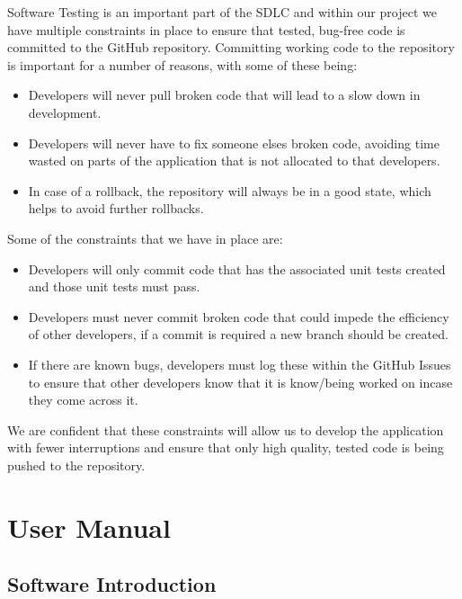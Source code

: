 \documentclass[
  english,
  a4paper,
,tablecaptionabove
]{scrartcl}
\providecommand{\tightlist}{%
  \setlength{\itemsep}{0pt}\setlength{\parskip}{0pt}}
\begin{document}
Software Testing is an important part of the SDLC and within our project
we have multiple constraints in place to ensure that tested, bug-free
code is committed to the GitHub repository. Committing working code to
the repository is important for a number of reasons, with some of these
being:

\begin{itemize}
\tightlist
\item
  Developers will never pull broken code that will lead to a slow down
  in development.
\item
  Developers will never have to fix someone elses broken code, avoiding
  time wasted on parts of the application that is not allocated to that
  developers.
\item
  In case of a rollback, the repository will always be in a good state,
  which helps to avoid further rollbacks.
\end{itemize}

Some of the constraints that we have in place are:

\begin{itemize}
\tightlist
\item
  Developers will only commit code that has the associated unit tests
  created and those unit tests must pass.
\item
  Developers must never commit broken code that could impede the
  efficiency of other developers, if a commit is required a new branch
  should be created.
\item
  If there are known bugs, developers must log these within the GitHub
  Issues to ensure that other developers know that it is know/being
  worked on incase they come across it.
\end{itemize}

We are confident that these constraints will allow us to develop the
application with fewer interruptions and ensure that only high quality,
tested code is being pushed to the repository.

\newpage

\hypertarget{user-manual}{%
\section{User Manual}\label{user-manual}}

\hypertarget{software-introduction}{%
\subsection{Software Introduction}\label{software-introduction}}
\end{document}
